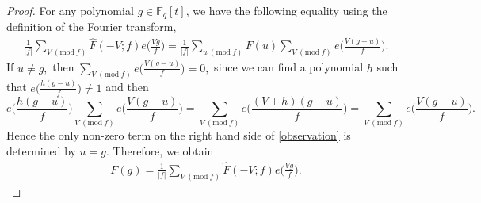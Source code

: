 \documentclass[12pt,reqno]{amsart}
\newcommand{\Mod}[1]{\ (\mathrm{mod}\ #1)}
\newcommand{\BF}{\mathbb{F}}
\begin{document}
\begin{proof}
    For any polynomial $g \in \BF_{q}[t]$, we have the following equality using the definition of the Fourier transform, 
\begin{align}\label{observation}
\frac{1}{|f|} \sum\limits_{V\Mod f} \widehat{F}(-V;f)e \Big (\frac{Vg}{f} \Big) = \frac{1}{|f|}\sum\limits_{u\Mod f} F(u) \sum\limits_{V\Mod f} e\Big ( \frac{V(g-u)}{f} \Big).
\end{align}
If $ u \neq g,$ then $\sum\limits_{V\Mod f} e\Big ( \frac{V(g-u)}{f} \Big) = 0,$ since we can find a polynomial $h$ such that $e\Big ( \frac{h(g-u)}{f} \Big) \neq 1$ and then
$$
e\Big ( \frac{h(g-u)}{f} \Big )\sum\limits_{V\Mod f} e\Big ( \frac{V(g-u)}{f} \Big) = \sum\limits_{V\Mod f} e \Big ( \frac{(V+h)(g-u)}{f} \Big ) = \sum\limits_{V\Mod f} e \Big( \frac{V(g-u)}{f}\Big ).
$$
Hence the only non-zero term on the right hand side of \eqref{observation} is determined by $u=g.$ Therefore, we obtain
\begin{align}\label{firstfact}
F(g) = \frac{1}{|f|} \sum\limits_{V\Mod f} \widehat{F}(-V;f)e \Big (\frac{Vg}{f} \Big).
\end{align}


\end{proof}
\end{document}
